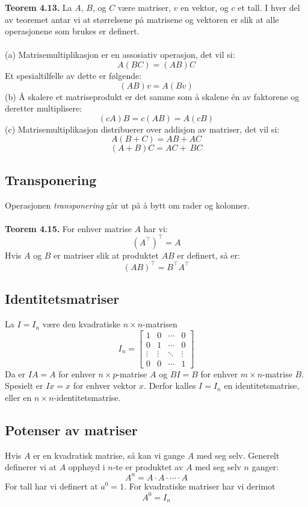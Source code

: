 \documentclass{article}
\begin{document}
\textbf{Teorem 4.13.} La $A$, $B$, og $C$ være matriser, $v$ en vektor, og $c$ et tall. I hver del av teoremet antar vi at størrelsene på matrisene og vektoren er slik at alle operasjonene som brukes er definert.\\\\
(a) Matrisemultiplikasjon er en assosiativ operasjon, det vil si:
\[ A(BC) = (AB)C \]
Et spesialtilfelle av dette er følgende:
\[ (AB)v = A(Bv) \]
(b) Å skalere et matriseprodukt er det samme som å skalene én av faktorene og deretter multiplisere:
\[ (cA)B = c(AB) = A(cB) \]
(c) Matrisemultiplikasjon distribuerer over addisjon av matriser, det vil si:
\[ A(B+C) = AB + AC \]
\[ (A + B)C = AC +\ BC \]


\subsection{Transponering}
Operasjonen \textit{transponering} går ut på å bytt om rader og kolonner.
\\\\
\textbf{Teorem 4.15.} For enhver matrise $A$ har vi:
\[ (A^\top)^\top = A \]
Hvis $A$ og $B$ er matriser slik at produktet $AB$ er definert, så er:
\[ (AB)^\top = B^\top A^\top \]


\subsection{Identitetsmatriser}
La $I = I_n$ være den kvadratiske $n \times n$-matrisen
\[ I_n = \begin{bmatrix}
1 & 0 & \cdots & 0 \\
0 & 1 & \cdots & 0 \\
\vdots & \vdots & \ddots & \vdots \\
0 & 0 & \cdots & 1
\end{bmatrix} \]
Da er $IA = A$ for enhver $n \times p$-matrise $A$ og $BI = B$ for enhver $m \times n$-matrise $B$. Spesielt er $Ix = x$ for enhver vektor $x$. Derfor kalles $I = I_n$ en identitetsmatrise, eller en $n \times n$-identitetsmatrise.


\subsection{Potenser av matriser}
Hvis $A$ er en kvadratisk matrise, så kan vi gange $A$ med seg selv. Generelt definerer vi at $A$ opphøyd i $n$-te er produktet av $A$ med seg selv $n$ ganger:
\[ A^n = A \cdot A \cdot \cdots \cdot A \]
For tall har vi definert at $a^0 = 1$. For kvadratiske matriser har vi derimot
\[ A^0 = I_n \]
\end{document}
